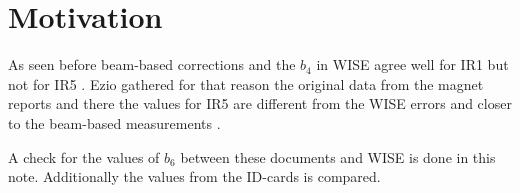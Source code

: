 \section{Motivation}
As seen before beam-based corrections and the $b_4$ in WISE 
\cite{AcceleratorTechnologyDepartmentWindowsInterfaceSimulation} agree well 
for IR1 but not for IR5 \cite{MacleanBeambasedVsModel2019}.
Ezio gathered for that reason the original data from the magnet reports 
\cite{TodescoFidelReportPartII} and there the values for IR5 are 
different from the WISE errors and closer to the beam-based
measurements \cite{TodescoB4MQXAMQXB2020}.

A check for the values of $b_6$ between these documents and WISE 
is done in this note.
Additionally the values from the ID-cards is compared. 